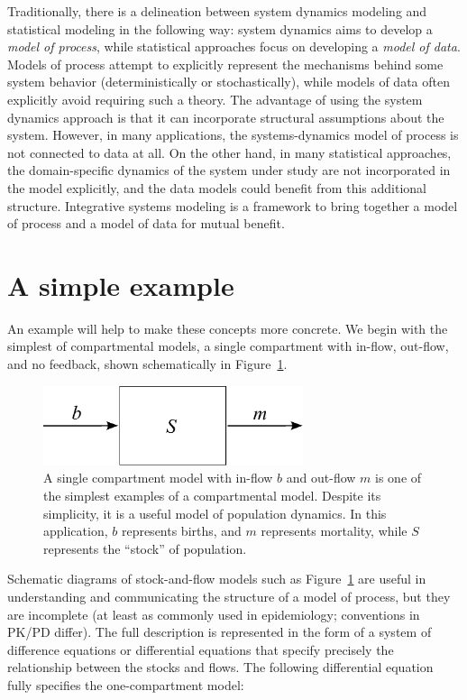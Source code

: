 Traditionally, there is a delineation between system dynamics modeling
and statistical modeling in the following way: system dynamics aims to
develop a \emph{model of process}, while statistical approaches focus
on developing a \emph{model of data}. Models of process attempt to
explicitly represent the mechanisms behind some system behavior
(deterministically or stochastically), while models of data often
explicitly avoid requiring such a theory. The advantage of using the
system dynamics approach is that it can incorporate structural
assumptions about the system.  However, in many applications, the
systems-dynamics model of process is not connected to data at all.  On
the other hand, in many statistical approaches, the domain-specific
dynamics of the system under study are not incorporated in the model
explicitly, and the data models could benefit from this additional
structure.  Integrative systems modeling is a framework to bring
together a model of process and a model of data for mutual benefit.

\section{A simple example}

An example will help to make these concepts more concrete.  We begin
with the simplest of compartmental models, a single compartment with
in-flow, out-flow, and no feedback, shown schematically in
Figure~\ref{forward-sim-one-compartment}.

\begin{figure}[h]
\begin{center}
\includegraphics[width=3in]{S.pdf}
\caption{A single compartment model with in-flow $b$ and out-flow $m$
  is one of the simplest examples of a compartmental model. Despite
  its simplicity, it is a useful model of population dynamics.  In
  this application, $b$ represents births, and $m$ represents
  mortality, while $S$ represents the ``stock'' of
  population.}
\label{forward-sim-one-compartment}
\end{center}
\end{figure}


Schematic diagrams of stock-and-flow models such as
Figure~\ref{forward-sim-one-compartment} are useful in understanding
and communicating the structure of a model of process, but they are
incomplete (at least as commonly used in epidemiology; conventions in
PK/PD differ). The full description is represented in the form of a
system of difference equations or differential equations that specify
precisely the relationship between the stocks and flows. The following
differential equation fully specifies the one-compartment model:

